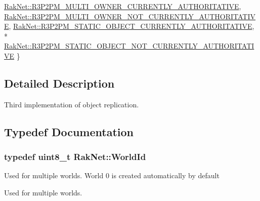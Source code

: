 \begin{DoxyCompactItemize}
\hyperlink{group___r_e_p_l_i_c_a___m_a_n_a_g_e_r___g_r_o_u_p3_gga91a588da9d58bc86b8fb7e4f27ddcf7ea47ff84aa5cdf83b800d551ab607b1d1f}{Rak\-Net\-::\-R3\-P2\-P\-M\-\_\-\-M\-U\-L\-T\-I\-\_\-\-O\-W\-N\-E\-R\-\_\-\-C\-U\-R\-R\-E\-N\-T\-L\-Y\-\_\-\-A\-U\-T\-H\-O\-R\-I\-T\-A\-T\-I\-V\-E}, 
\hyperlink{group___r_e_p_l_i_c_a___m_a_n_a_g_e_r___g_r_o_u_p3_gga91a588da9d58bc86b8fb7e4f27ddcf7eac0b780c5f936449de42e6032e6bca4e6}{Rak\-Net\-::\-R3\-P2\-P\-M\-\_\-\-M\-U\-L\-T\-I\-\_\-\-O\-W\-N\-E\-R\-\_\-\-N\-O\-T\-\_\-\-C\-U\-R\-R\-E\-N\-T\-L\-Y\-\_\-\-A\-U\-T\-H\-O\-R\-I\-T\-A\-T\-I\-V\-E}, 
\hyperlink{group___r_e_p_l_i_c_a___m_a_n_a_g_e_r___g_r_o_u_p3_gga91a588da9d58bc86b8fb7e4f27ddcf7ead8f368971bbf8939507a5f0550e1af04}{Rak\-Net\-::\-R3\-P2\-P\-M\-\_\-\-S\-T\-A\-T\-I\-C\-\_\-\-O\-B\-J\-E\-C\-T\-\_\-\-C\-U\-R\-R\-E\-N\-T\-L\-Y\-\_\-\-A\-U\-T\-H\-O\-R\-I\-T\-A\-T\-I\-V\-E}, 
\\*
\hyperlink{group___r_e_p_l_i_c_a___m_a_n_a_g_e_r___g_r_o_u_p3_gga91a588da9d58bc86b8fb7e4f27ddcf7ea3b8743fa18228e729bcad3e2a89c7752}{Rak\-Net\-::\-R3\-P2\-P\-M\-\_\-\-S\-T\-A\-T\-I\-C\-\_\-\-O\-B\-J\-E\-C\-T\-\_\-\-N\-O\-T\-\_\-\-C\-U\-R\-R\-E\-N\-T\-L\-Y\-\_\-\-A\-U\-T\-H\-O\-R\-I\-T\-A\-T\-I\-V\-E}
 \}
\end{DoxyCompactItemize}


\subsection{Detailed Description}
Third implementation of object replication. 

\subsection{Typedef Documentation}
\hypertarget{group___r_e_p_l_i_c_a___m_a_n_a_g_e_r___g_r_o_u_p3_ga44b59af8e882248f61aa41d8ace38bf7}{
\subsubsection[{World\-Id}]{\setlength{\rightskip}{0pt plus 5cm}typedef uint8\-\_\-t {\bf Rak\-Net\-::\-World\-Id}}}\label{group___r_e_p_l_i_c_a___m_a_n_a_g_e_r___g_r_o_u_p3_ga44b59af8e882248f61aa41d8ace38bf7}
Used for multiple worlds. World 0 is created automatically by default

Used for multiple worlds. 


